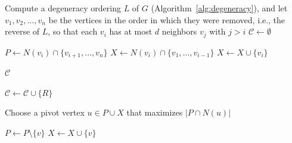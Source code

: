 \documentclass{article}
\theoremstyle{definition}
\begin{document}
\begin{algorithm}[H]
\caption{Bron-Kerbosch Algorithm for $d$-Degenerate Graphs}
\label{alg:bron-kerbosch-degenerate}
\begin{algorithmic}[1]
        \State Compute a degeneracy ordering $L$ of $G$ (Algorithm~\ref{alg:degeneracy}), and let $v_1, v_2, \ldots, v_n$ be the vertices in the order in which they were removed, i.e., the reverse of $L$, so that each $v_i$ has at most $d$ neighbors $v_j$ with $j > i$
        \State $\mathcal{C} \gets \emptyset$ 
        
            \State $P \gets N(v_i) \cap \{v_{i+1}, \ldots, v_n\}$ 
            \State $X \gets N(v_i) \cap \{v_1, \ldots, v_{i-1}\}$ 
            \State {}
            \State $X \gets X \cup \{v_i\}$ 
        \EndFor
        
        \State \Return $\mathcal{C}$ 
    \EndProcedure
    
    \Statex
            \State $\mathcal{C} \gets \mathcal{C} \cup \{R\}$ 
            \State \Return
        \EndIf
        
        \State Choose a pivot vertex $u \in P \cup X$ that maximizes $|P \cap N(u)|$
        
            \State {}
            \State $P \gets P \setminus \{v\}$
            \State $X \gets X \cup \{v\}$
        \EndFor
    \EndProcedure
\end{algorithmic}
\end{algorithm}
\end{document}
